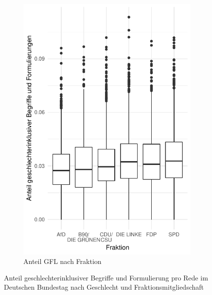 \documentclass[12pt, 
    twoside=false, 
    bibliography=totoc, 
    numbers=endperiod, 
    headings=normal, 
    toc=chapterentrydotfill
    ]{scrbook}
\begin{document}
\begin{figure}[H]
\begin{subfigure}{.5\textwidth}
      \includegraphics[width=.9\linewidth]{document/images/boxplot_gfl_fraktion.pdf}
      \caption{Anteil GFL nach Fraktion}
      \label{fig:boxplot_gfl_fraktion}
    \end{subfigure}
    \caption[Anteil geschlechterinklusiver Begriffe und Formulierung pro Rede im Deutschen Bundestag]{Anteil geschlechterinklusiver Begriffe und Formulierung pro Rede im Deutschen Bundestag nach Geschlecht und Fraktionsmitgliedschaft}
    \label{fig:boxplot_gfl}
\end{figure}
\end{document}
